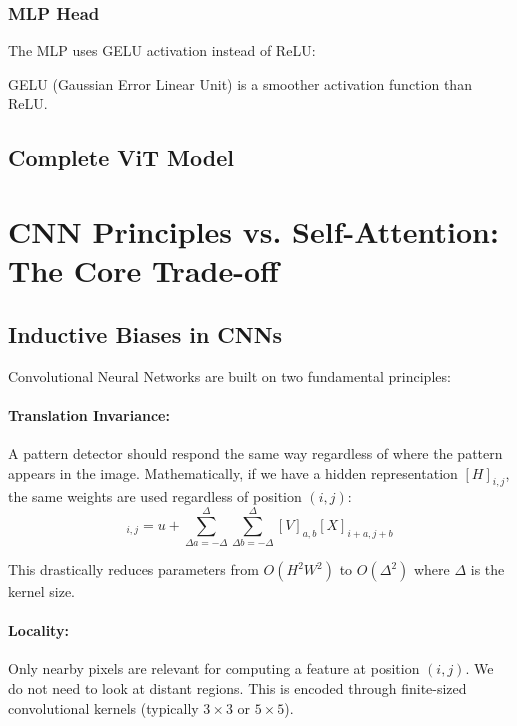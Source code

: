 \documentclass{article}
\begin{document}
\subsubsection{MLP Head}

The MLP uses GELU activation instead of ReLU:


GELU (Gaussian Error Linear Unit) is a smoother activation function than ReLU.

\subsection{Complete ViT Model}


\section{CNN Principles vs. Self-Attention: The Core Trade-off}

\subsection{Inductive Biases in CNNs}

Convolutional Neural Networks are built on two fundamental principles:

\paragraph{Translation Invariance:} A pattern detector should respond the same way regardless of where the pattern appears in the image. Mathematically, if we have a hidden representation $[H]_{i,j}$, the same weights are used regardless of position $(i,j)$:
\begin{equation}
[H]_{i,j} = u + \sum_{\Delta a = -\Delta}^{\Delta} \sum_{\Delta b = -\Delta}^{\Delta} [V]_{a,b} [X]_{i+a,j+b}
\end{equation}

This drastically reduces parameters from $O(H^2 W^2)$ to $O(\Delta^2)$ where $\Delta$ is the kernel size.

\paragraph{Locality:} Only nearby pixels are relevant for computing a feature at position $(i,j)$. We do not need to look at distant regions. This is encoded through finite-sized convolutional kernels (typically $3 \times 3$ or $5 \times 5$).
\end{document}
